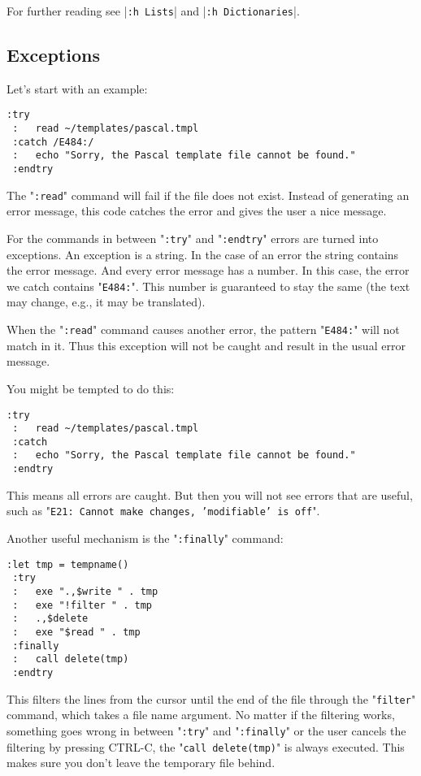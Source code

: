 For further reading see |\verb!:h Lists!| and |\verb!:h Dictionaries!|.
\subsection{Exceptions}
Let's start with an example:

\begin{Verbatim}[samepage=true]
 :try
 :   read ~/templates/pascal.tmpl
 :catch /E484:/
 :   echo "Sorry, the Pascal template file cannot be found."
 :endtry
\end{Verbatim}

The "\verb!:read!" command will fail if the file does not exist.
Instead of generating an error message, this code catches the error and gives the user a nice message.

For the commands in between "\verb!:try!" and "\verb!:endtry!" errors are turned into exceptions.
An exception is a string.
In the case of an error the string contains the error message.
And every error message has a number.
In this case, the error we catch contains "\verb!E484:!".
This number is guaranteed to stay the same (the text may change, e.g., it may be translated).

When the "\verb!:read!" command causes another error, the pattern "\verb!E484:!" will not match in it.
Thus this exception will not be caught and result in the usual error message.

You might be tempted to do this:

\begin{Verbatim}[samepage=true]
 :try
 :   read ~/templates/pascal.tmpl
 :catch
 :   echo "Sorry, the Pascal template file cannot be found."
 :endtry
\end{Verbatim}

This means all errors are caught.
But then you will not see errors that are useful, such as "\texttt{E21: Cannot make changes, 'modifiable' is off}".

Another useful mechanism is the "\verb!:finally!" command:

\begin{Verbatim}[samepage=true]
 :let tmp = tempname()
 :try
 :   exe ".,$write " . tmp
 :   exe "!filter " . tmp
 :   .,$delete
 :   exe "$read " . tmp
 :finally
 :   call delete(tmp)
 :endtry
\end{Verbatim}

This filters the lines from the cursor until the end of the file through the "\verb!filter!" command, which takes a file name argument.
No matter if the filtering works, something goes wrong in between "\verb!:try!" and "\verb!:finally!" or the user cancels the filtering by pressing CTRL-C, the "\verb!call delete(tmp)!" is always executed.
This makes sure you don't leave the temporary file behind.

